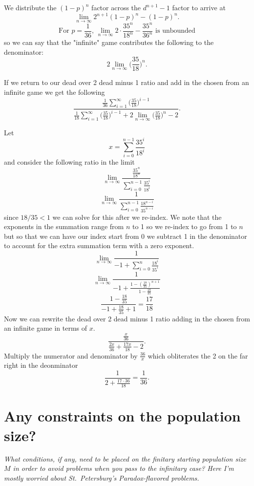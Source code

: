 \documentclass[article,twocolumn]{memoir}
\begin{document}
We distribute the $(1-p)^n$ factor across the $d^{n+1}-1$ factor to arrive at
$$\lim_{n\to\infty}2^{n+1}(1-p)^n - (1-p)^n.$$
$$\text{For }p=\frac{1}{36}\text{, }\lim_{n\to\infty}2\cdot\frac{35^n}{18^n} - \frac{35^n}{36^n}\text{ is unbounded}$$
so we can say that the "infinite" game contributes the following to the denominator:
$$2\lim_{n\to\infty}\bigg(\frac{35}{18}\bigg)^n.$$

If we return to our dead over 2 dead minus 1 ratio and add in the chosen from an infinite game we get the following
$$\frac{\frac{1}{36}\sum_{i=1}^\infty \bigg(\frac{35}{18}\bigg)^{i-1}}{\frac{1}{18}\sum_{i=1}^\infty \bigg(\frac{35}{18}\bigg)^{i-1}+2\lim_{n\to\infty}\bigg(\frac{35}{18}\bigg)^n -2}.$$

Let  
$$x= \sum_{i=0}^{n-1}\frac{35^i}{18^i}$$
and consider the following ratio in the limit
$$\lim_{n\to\infty}\frac{\frac{35^n}{18^n}}{\sum_{i=0}^{n-1}\frac{35^i}{18^i}}$$
$$\lim_{n\to\infty}\frac{1}{\sum_{i=0}^{n-1}\frac{18^{n-i}}{35^{n-i}}}$$
since $18/35 < 1$ we can solve for this after we re-index.
We note that the exponents in the summation range from $n$ to 1 so we re-index to go from 1 to $n$ but so that we can have our index start from 0 we subtract 1 in the denominator to account for the extra summation term with a zero exponent.
$$\lim_{n\to\infty}\frac{1}{-1+\sum_{i=0}^{n}\frac{18^{i}}{35^{i}}}$$
$$\lim_{n\to\infty}\frac{1}{-1+\frac{1-(\frac{18}{35})^{n+1}}{1-\frac{18}{35}}}$$
$$\frac{1-\frac{18}{35}}{-1+\frac{18}{35}+1} = \frac{17}{18}$$
Now we can rewrite the dead over 2 dead minus 1 ratio adding in the chosen from an infinite game in terms of $x$.
$$\frac{\frac{x}{36}}{\frac{2x}{36}+\frac{17x}{18}-2}.$$
Multiply the numerator and denominator by $\frac{36}{x}$ which obliterates the 2 on the far right in the deonminator
$$\frac{1}{2+\frac{17\cdot36}{18}}=\frac{1}{36}.$$


\chapter{Any constraints on the population size?}

\emph{What conditions, if any, need to be placed on the finitary starting population size $M$ in order to avoid problems when you pass to the infinitary case? 
Here I'm mostly worried about St.~Petersburg's Paradox-flavored problems.}

\vspace{1em}
\end{document}
